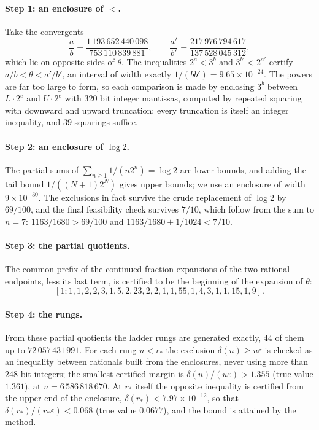 \paragraph{Step 1: an enclosure of $\lt$.} Take the convergents
\[
  \frac ab=\frac{1\,193\,652\,440\,098}{753\,110\,839\,881},\qquad
  \frac{a'}{b'}=\frac{217\,976\,794\,617}{137\,528\,045\,312},
\]
which lie on opposite sides of
$\theta$. The inequalities $2^a<3^b$ and $3^{b'}<2^{a'}$ certify
$a/b<\theta<a'/b'$, an interval of width exactly $1/(bb')=9.65\times10^{-24}$.
The powers are far too large to form, so each comparison is made by enclosing
$3^b$ between $L\cdot2^e$ and $U\cdot2^e$ with $320$ bit integer mantissas,
computed by repeated squaring with downward and upward truncation; every
truncation is itself an integer inequality, and $39$ squarings suffice.

\paragraph{Step 2: an enclosure of $\log2$.} The partial sums of
$\sum_{n\ge1}1/(n2^n)=\log2$ are lower bounds, and adding the tail bound
$1/((N+1)2^N)$ gives upper bounds; we use an enclosure of width
$9\times10^{-30}$. The exclusions in fact survive the crude replacement of
$\log2$ by $69/100$, and the final feasibility check survives $7/10$, which
follow from the sum to $n=7$: $1163/1680>69/100$ and
$1163/1680+1/1024<7/10$.

\paragraph{Step 3: the partial quotients.} The common prefix of the continued
fraction expansions of the two rational endpoints, less its last term, is
certified to be the beginning of the expansion of $\theta$:
\[ [1;1,1,2,2,3,1,5,2,23,2,2,1,1,55,1,4,3,1,1,15,1,9]. \]

\paragraph{Step 4: the rungs.} From these partial quotients the ladder rungs
are generated exactly, $44$ of them up to $72\,057\,431\,991$. For each rung
$u<r_*$ the exclusion $\delta(u)\ge u\varepsilon$ is checked as an inequality
between rationals built from the enclosures, never using more than $248$ bit
integers; the smallest certified margin is $\delta(u)/(u\varepsilon)>1.355$ (true value $1.361$), at
$u=6\,586\,818\,670$.
At $r_*$ itself the opposite inequality is certified from the upper end of the enclosure, $\delta(r_*)<7.97\times10^{-12}$, so that $\delta(r_*)/(r_*\varepsilon)<0.068$ (true value $0.0677$), and the bound is attained by the method.

